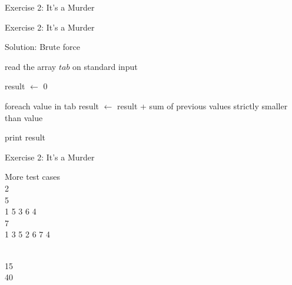 \documentclass{beamer}
\begin{document}
\begin{frame}{Exercise 2: It's a Murder}
\begin{overlayarea}{\textwidth}{\textheight}

  \end{overlayarea}
\end{frame}

\begin{frame}[fragile]{Exercise 2: It's a Murder}

  \begin{code}{Solution: Brute force}
    \begin{PseudoCode}
read the array $tab$ on standard input

result $\leftarrow$ 0

foreach value in tab
    result $\leftarrow$ result + sum of previous values strictly smaller than value

print result
    \end{PseudoCode}
  \end{code}
\end{frame}


\begin{frame}{Exercise 2: It's a Murder}

  \begin{exampleblock}{More test cases}
    \\
    2\\5\\1 5 3 6 4\\7\\1 3 5 2 6 7 4

    \medskip
    \\
    15\\40
  \end{exampleblock}
\end{frame}
\end{document}
